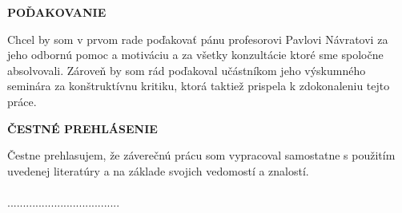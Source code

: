 \newpage
\thispagestyle{plain}
\vspace*{15cm}
\begin{large}
\noindent
\textbf{POĎAKOVANIE} \\
\end{large}
\noindent
Chcel by som v prvom rade poďakovať pánu profesorovi Pavlovi Návratovi za jeho odbornú pomoc a motiváciu a za všetky konzultácie ktoré sme spoločne absolvovali. Zároveň by som rád poďakoval učástníkom jeho výskumného seminára za konštruktívnu kritiku, ktorá taktiež prispela k zdokonaleniu tejto práce.

\newpage
\thispagestyle{plain}
\vspace*{15cm}
\begin{large}
\noindent
\textbf{ČESTNÉ PREHLÁSENIE} \\
\end{large}
\noindent
Čestne prehlasujem, že záverečnú prácu som vypracoval samostatne s použitím uvedenej literatúry a na základe svojich vedomostí a znalostí.
\\
\vspace*{0.5cm}\\
\hspace*{10cm}....................................\\
\hspace*{10.7cm} \Author
